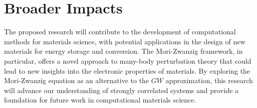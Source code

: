 \documentclass[11pt]{article} %
\begin{document}
\section*{Broader Impacts}
The proposed research will contribute to the development of computational methods for materials science, with potential applications in the design of new materials for energy storage and conversion. The Mori-Zwanzig framework, in particular, offers a novel approach to many-body perturbation theory that could lead to new insights into the electronic properties of materials. By exploring the Mori-Zwanzig equation as an alternative to the $GW$ approximation, this research will advance our understanding of strongly correlated systems and provide a foundation for future work in computational materials science.


\end{document}
